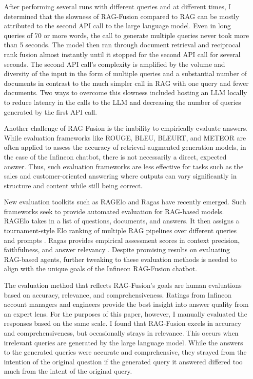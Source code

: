 \documentclass{article}
\begin{document}
After performing several runs with different queries and at different times, I determined that the slowness of RAG-Fusion compared to RAG can be mostly attributed to the second API call to the large language model. Even in long queries of 70 or more words, the call to generate multiple queries never took more than 5 seconds. The model then ran through document retrieval and reciprocal rank fusion almost instantly until it stopped for the second API call for several seconds. The second API call's complexity is amplified by the volume and diversity of the input in the form of multiple queries and a substantial number of documents in contrast to the much simpler call in RAG with one query and fewer documents. Two ways to overcome this slowness included hosting an LLM locally to reduce latency in the calls to the LLM and decreasing the number of queries generated by the first API call.

Another challenge of RAG-Fusion is the inability to empirically evaluate answers. While evaluation frameworks like ROUGE, BLEU, BLEURT, and METEOR are often applied to assess the accuracy of retrieval-augmented generation models, in the case of the Infineon chatbot, there is not necessarily a direct, expected answer. Thus, such evaluation frameworks are less effective for tasks such as the sales and customer-oriented answering where outputs can vary significantly in structure and content while still being correct. 

New evaluation toolkits such as RAGElo and Ragas have recently emerged. Such frameworks seek to provide automated evaluation for RAG-based models. RAGElo takes in a list of questions, documents, and answers. It then assigns a tournament-style Elo ranking of multiple RAG pipelines over different queries and prompts \cite{RAGELO}. Ragas provides empirical assessment scores in context precision, faithfulness, and answer relevancy \cite{RAGAS}. Despite promising results on evaluating RAG-based agents, further tweaking to these evaluation methods is needed to align with the unique goals of the Infineon RAG-Fusion chatbot.

The evaluation method that reflects RAG-Fusion’s goals are human evaluations based on accuracy, relevance, and comprehensiveness. Ratings from Infineon account managers and engineers provide the best insight into answer quality from an expert lens. For the purposes of this paper, however, I manually evaluated the responses based on the same scale. I found that RAG-Fusion excels in accuracy and comprehensiveness, but occasionally strays in relevance. This occurs when irrelevant queries are generated by the large language model. While the answers to the generated queries were accurate and comprehensive, they strayed from the intention of the original question if the generated query it answered differed too much from the intent of the original query.
\end{document}
